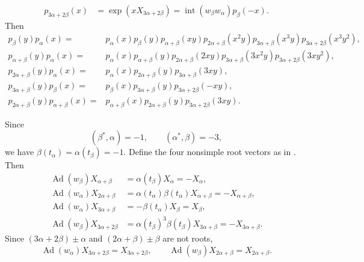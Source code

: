 {\begin{enumerate}
\[\begin{aligned}
      p_{3\alpha+2\beta}(x)
        &=\exp(xX_{3\alpha+2\beta})
          =\operatorname{int}(w_\beta w_\alpha)p_\beta(-x).
    \end{aligned}
    \]
    Then
    \[
    \begin{aligned}
      p_\beta(y)p_\alpha(x)
        ={}&p_\alpha(x)p_\beta(y)p_{\alpha+\beta}(xy)
          p_{2\alpha+\beta}(x^2y)p_{3\alpha+\beta}(x^3y)
          p_{3\alpha+2\beta}(x^3y^2),\\
      p_{\alpha+\beta}(y)p_\alpha(x)
        ={}&p_\alpha(x)p_{\alpha+\beta}(y)
          p_{2\alpha+\beta}(2xy)p_{3\alpha+\beta}(3x^2y)
          p_{3\alpha+2\beta}(3xy^2),\\
      p_{2\alpha+\beta}(y)p_\alpha(x)
        ={}&p_\alpha(x)p_{2\alpha+\beta}(y)
          p_{3\alpha+\beta}(3xy),\\
      p_{3\alpha+\beta}(y)p_\beta(x)
        ={}&p_\beta(x)p_{3\alpha+\beta}(y)
          p_{3\alpha+2\beta}(-xy),\\
      p_{2\alpha+\beta}(y)p_{\alpha+\beta}(x)
        ={}&p_{\alpha+\beta}(x)p_{2\alpha+\beta}(y)
          p_{3\alpha+2\beta}(3xy).
    \end{aligned}
    \]
\end{enumerate}}

Since
\[
  (\beta^*,\alpha)=-1,\qquad(\alpha^*,\beta)=-3,
\]
we have \(\beta(t_\alpha)=\alpha(t_\beta)=-1\). Define the four
nonsimple root vectors as in . Then
\[
\begin{aligned}
  \operatorname{Ad}(w_\beta)X_{\alpha+\beta}
    &=\alpha(t_\beta)X_\alpha=-X_\alpha,\\
  \operatorname{Ad}(w_\alpha)X_{2\alpha+\beta}
    &=\alpha(t_\alpha)\beta(t_\alpha)X_{\alpha+\beta}
      =-X_{\alpha+\beta},\\
  \operatorname{Ad}(w_\alpha)X_{3\alpha+\beta}
    &=-\beta(t_\alpha)X_\beta=X_\beta,\\
  \operatorname{Ad}(w_\beta)X_{3\alpha+2\beta}
    &=\alpha(t_\beta)^3\beta(t_\beta)X_{3\alpha+\beta}
      =-X_{3\alpha+\beta}.
\end{aligned}
\]
Since \((3\alpha+2\beta)\pm\alpha\) and
\((2\alpha+\beta)\pm\beta\) are not roots,
\[
  \operatorname{Ad}(w_\alpha)X_{3\alpha+2\beta}=X_{3\alpha+2\beta},
  \qquad
  \operatorname{Ad}(w_\beta)X_{2\alpha+\beta}=X_{2\alpha+\beta}.
\]

